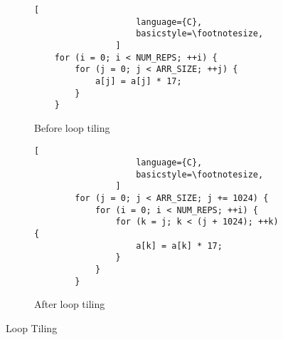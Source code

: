 \begin{figure}[h]
    \begin{adjustbox}{minipage=\linewidth,scale=0.8}
        \begin{subfigure}{.50\textwidth}
            \centering
            \begin{lstlisting}[
                    language={C},
                    basicstyle=\footnotesize,
                ]
    for (i = 0; i < NUM_REPS; ++i) {
        for (j = 0; j < ARR_SIZE; ++j) {
            a[j] = a[j] * 17;
        }
    }
                \end{lstlisting}
            \caption{Before loop tiling}
            \label{fig:tiling:sub1}
        \end{subfigure}%
        \begin{subfigure}{.50\textwidth}
            \centering
            \begin{lstlisting}[
                    language={C},
                    basicstyle=\footnotesize,
                ]
        for (j = 0; j < ARR_SIZE; j += 1024) {
            for (i = 0; i < NUM_REPS; ++i) {
                for (k = j; k < (j + 1024); ++k) {
                    a[k] = a[k] * 17;
                }
            }
        }
                \end{lstlisting}
            \caption{After loop tiling}
            \label{fig:tiling:sub2}
        \end{subfigure}
    \end{adjustbox}
    \caption{Loop Tiling}
    \label{fig:loop:tiling}
\end{figure}




